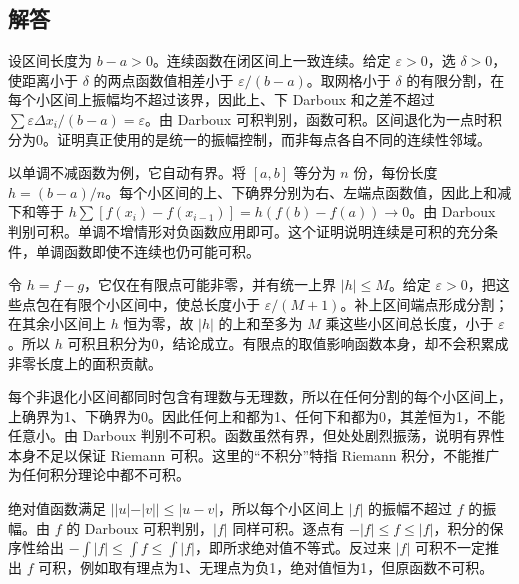 \documentclass[12pt,fontset=fandol]{ctexart}
\begin{document}
\subsection{解答}
\begin{solve}\label{ans:c30q1}
设区间长度为 $b-a>0$。连续函数在闭区间上一致连续。给定 $\varepsilon>0$，选 $\delta>0$，使距离小于 $\delta$ 的两点函数值相差小于 $\varepsilon/(b-a)$。取网格小于 $\delta$ 的有限分割，在每个小区间上振幅均不超过该界，因此上、下 Darboux 和之差不超过 $\sum\varepsilon\Delta x_i/(b-a)=\varepsilon$。由 Darboux 可积判别，函数可积。区间退化为一点时积分为0。证明真正使用的是统一的振幅控制，而非每点各自不同的连续性邻域。
\end{solve}

\begin{solve}\label{ans:c30q2}
以单调不减函数为例，它自动有界。将 $[a,b]$ 等分为 $n$ 份，每份长度 $h=(b-a)/n$。每个小区间的上、下确界分别为右、左端点函数值，因此上和减下和等于 $h\sum[f(x_i)-f(x_{i-1})]=h(f(b)-f(a))\to0$。由 Darboux 判别可积。单调不增情形对负函数应用即可。这个证明说明连续是可积的充分条件，单调函数即使不连续也仍可能可积。
\end{solve}

\begin{solve}\label{ans:c30q3}
令 $h=f-g$，它仅在有限点可能非零，并有统一上界 $|h|\le M$。给定 $\varepsilon>0$，把这些点包在有限个小区间中，使总长度小于 $\varepsilon/(M+1)$。补上区间端点形成分割；在其余小区间上 $h$ 恒为零，故 $|h|$ 的上和至多为 $M$ 乘这些小区间总长度，小于 $\varepsilon$。所以 $h$ 可积且积分为0，结论成立。有限点的取值影响函数本身，却不会积累成非零长度上的面积贡献。
\end{solve}

\begin{solve}\label{ans:c30q4}
每个非退化小区间都同时包含有理数与无理数，所以在任何分割的每个小区间上，上确界为1、下确界为0。因此任何上和都为1、任何下和都为0，其差恒为1，不能任意小。由 Darboux 判别不可积。函数虽然有界，但处处剧烈振荡，说明有界性本身不足以保证 Riemann 可积。这里的“不积分”特指 Riemann 积分，不能推广为任何积分理论中都不可积。
\end{solve}

\begin{solve}\label{ans:c30q5}
绝对值函数满足 $||u|-|v||\le|u-v|$，所以每个小区间上 $|f|$ 的振幅不超过 $f$ 的振幅。由 $f$ 的 Darboux 可积判别，$|f|$ 同样可积。逐点有 $-|f|\le f\le|f|$，积分的保序性给出 $-\int|f|\le\int f\le\int|f|$，即所求绝对值不等式。反过来 $|f|$ 可积不一定推出 $f$ 可积，例如取有理点为1、无理点为负1，绝对值恒为1，但原函数不可积。
\end{solve}
\end{document}
